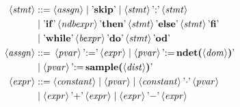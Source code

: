 \begin{figure}
\begin{align*}
\langle \mathit{stmt}\rangle &::= 
\langle \mathit{assgn} \rangle \mid \text{'\textbf{skip}'} \mid 
\langle\mathit{stmt}\rangle \, \text{';'} \, \langle \mathit{stmt}\rangle \\
%
&\mid   \text{'\textbf{if}'} \,
\langle\mathit{ndbexpr}\rangle\,\text{'\textbf{then}'} \, \langle
\mathit{stmt}\rangle \, \text{'\textbf{else}'} \, \langle \mathit{stmt}\rangle
\,\text{'\textbf{fi}'}
\\
%
&\mid  \text{'\textbf{while}'}\, \langle\mathit{bexpr}\rangle \,
\text{'\textbf{do}'} \, \langle \mathit{stmt}\rangle \, \text{'\textbf{od}'}
\\
\langle \mathit{assgn} \rangle &::= 
\,\langle\mathit{pvar}\rangle
\,\text{'$:=$'}\, \langle\mathit{expr} \rangle \mid 
\langle\mathit{pvar}\rangle \,\text{'$:=$}\,
\text{\textbf{ndet($\langle\mathit{dom}\rangle$)}'}
\\
&\mid \langle\mathit{pvar}\rangle \,\text{'$:=$}\,
\text{\textbf{sample($\langle\mathit{dist}\rangle$)}'}
%
%
%
%
%
%
\\
\vspace{0.5\baselineskip}
\langle\mathit{expr} \rangle &::= \langle \mathit{constant} \rangle \mid
\langle\mathit{pvar}\rangle
\mid \langle \mathit{constant} \rangle \,\text{'$\cdot$'} \,
\langle\mathit{pvar}\rangle
\\
%
&\mid \langle\mathit{expr} \rangle\, \text{'$+$'} \,\langle\mathit{expr} \rangle
\mid \langle\mathit{expr} \rangle\, \text{'$-$'} \,\langle\mathit{expr} \rangle

\end{align*}
\end{figure}
